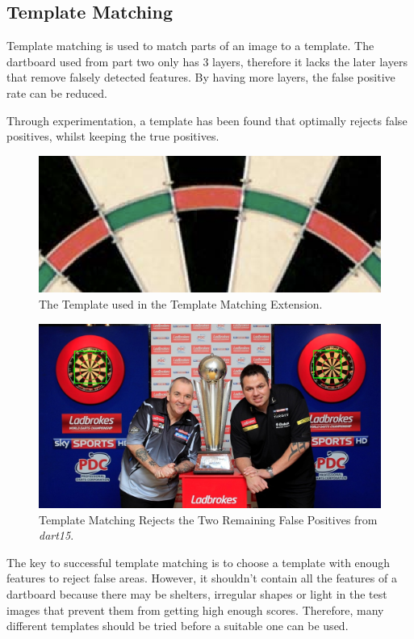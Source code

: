 \documentclass[conference]{IEEEtran}
\begin{document}
\subsection{Template Matching}
Template matching is used to  match parts of an image to a template. The dartboard used from part two only has 3 layers, therefore it lacks the later layers that remove falsely detected features. By having more layers, the false positive rate can be reduced. \par

Through experimentation, a template has been found that optimally rejects false positives, whilst keeping the true positives.  
\par 
\begin{figure}[!htb]
\begin{center}
\includegraphics[width=1\linewidth]{images/template.png}
\caption{The Template used in the Template Matching Extension. }
\label{default}
\end{center}
\end{figure}

\par 
\begin{figure}[!htb]
\begin{center}
\includegraphics[width=1\linewidth]{images/template_merit.jpg}
\caption{Template Matching Rejects the Two Remaining False Positives from \emph{dart15}.}
\label{default}
\end{center}
\end{figure}
The key to successful template matching is to choose a template with enough features to reject false areas. However, it shouldn't contain all the features of a dartboard because there may be shelters, irregular shapes or light in the test images that prevent them from getting high enough scores. Therefore, many different templates should be tried before a suitable one can be used.
\newpage
\end{document}
